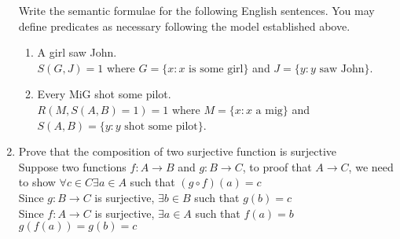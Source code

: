 \documentclass[12pt]{article}
\begin{document}
\begin{enumerate}
Write the semantic formulae for the following English sentences. You may define predicates as necessary following the model established above.
\begin{enumerate}
\item A girl saw John. \\
    $S(G,J)=1$ where $G=\{x: x \text{ is some girl}\}$ and $J=\{y: y \text{ saw John}\}$.
\item Every MiG shot some pilot.\\
    $R(M,S(A,B)=1)=1$ where $M=\{x: x \text{ a mig}\}$ and $S(A,B)=\{y: y \text{ shot some pilot}\}$.
\end{enumerate} 
\item Prove that the composition of two surjective function is surjective\\
    Suppose two functions $f: A \rightarrow B$ and $g: B \rightarrow C$, to proof that $A \rightarrow C$, we need to show
    $\forall c \in C \exists a \in A $ such that $( g \circ f)(a) = c$ \\
    Since $g : B \rightarrow C$ is surjective, $\exists b \in  B$ such that $g(b) = c$ \\
    Since $f : A \rightarrow C$ is surjective, $\exists a \in  A$ such that $f(a) = b$ \\
    $g(f(a)) = g(b) = c$
\end{enumerate}
\end{document}
